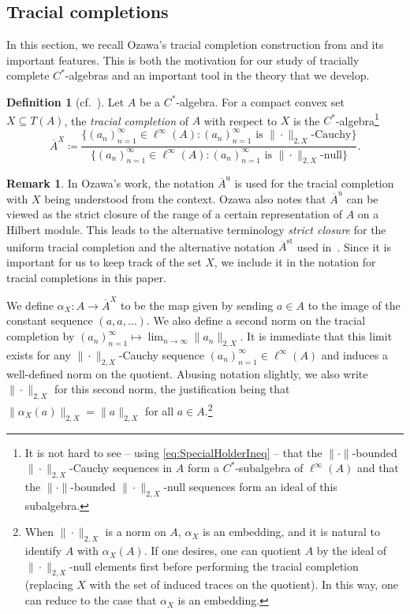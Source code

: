 \documentclass[a4paper,11pt]{amsart}
\theoremstyle{definition}
\newtheorem{definition}[theorem]{Definition}
\newtheorem{remark}[theorem]{Remark}
\numberwithin{equation}{section}
\numberwithin{theorem}{section}
\newcommand{\completion}[2]{\overline{#1}^{#2}}
\begin{document}
\subsection{Tracial completions}\label{sec:TraceNormCompletion}

In this section, we recall Ozawa's tracial completion construction from \cite{Oz13} and its important features. This is both the motivation for our study of tracially complete $C^*$-algebras and an important tool in the theory that we develop.


\begin{definition}[{cf.~\cite{Oz13}}]\label{def:UTCompletion}
	Let $A$ be a $C^*$-algebra. For a compact convex set $X \subseteq T(A)$, the \emph{tracial completion} of $A$ with respect to $X$ is the $C^*$-algebra\footnote{It is not hard to see -- using \eqref{eq:SpecialHolderIneq} -- that the $\|\cdot\|$-bounded $\|\cdot\|_{2,X}$-Cauchy sequences in $A$ form a $C^*$-subalgebra of $\ell^\infty(A)$ and that the $\|\cdot\|$-bounded $\|\cdot\|_{2,X}$-null sequences form an ideal of this subalgebra.}
	\begin{equation}
		\completion{A}{X} \coloneqq  \frac{\{(a_n)_{n=1}^\infty \in \ell^\infty(A): (a_n)_{n=1}^\infty \text{ is }\|\cdot\|_{2,X}\text{-Cauchy}\}}{\{(a_n)_{n=1}^\infty \in \ell^\infty(A): (a_n)_{n=1}^\infty \text{ is }\|\cdot\|_{2,X}\text{-null}\}}.
	\end{equation}
\end{definition}

\begin{remark}\label{footnote:StrictClosure}
	In Ozawa's work, the notation $\completion{A}{\mathrm{u}}$ is used for the tracial completion with $X$ being understood from the context. Ozawa also notes that $\completion{A}{\mathrm u}$ can be viewed as the strict closure of the range of a certain representation of $A$ on a Hilbert module. This leads to the alternative terminology \emph{strict closure} for the uniform tracial completion and the alternative notation $\completion{A}{\mathrm{st}}$ used in~\cite{Oz13,BBSTWW}. Since it is important for us to keep track of the set $X$, we include it in the notation for tracial completions in this paper.
\end{remark}

We define $\alpha_X\colon A \to \completion{A}{X}$ to be the map given by sending $a \in A$ to the image of the constant sequence $(a,a,\dots)$. We also define a second norm on the tracial completion by $(a_n)_{n=1}^\infty \mapsto \lim_{n\rightarrow\infty} \|a_n\|_{2,X}$. It is immediate that this limit exists for any $\|\cdot\|_{2,X}$-Cauchy sequence $(a_n)_{n=1}^\infty \in \ell^\infty(A)$ and induces a well-defined norm on the quotient. Abusing notation slightly, we also write $\|\cdot\|_{2,X}$ for this second norm, the justification being that $\|\alpha_X(a)\|_{2,X} = \|a\|_{2,X}$ for all $a \in A$.\footnote{
	When $\|\cdot\|_{2,X}$ is a norm on $A$, $\alpha_X$ is an embedding, and it is natural to identify $A$ with $\alpha_X(A)$. If one desires, one can quotient $A$ by the ideal of $\|\cdot\|_{2,X}$-null elements first before performing the tracial completion (replacing $X$ with the set of induced traces on the quotient). In this way, one can reduce to the case that $\alpha_X$ is an embedding.
}
\end{document}
